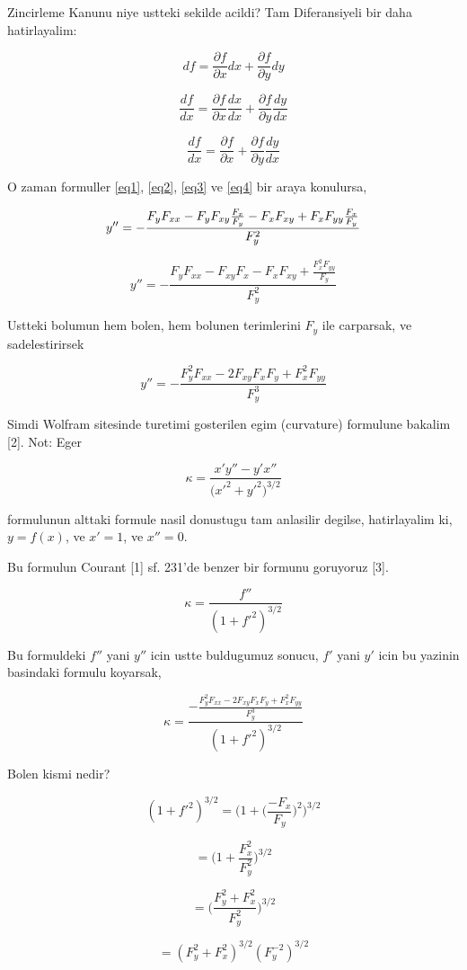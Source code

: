 \documentclass[12pt,fleqn]{article}\usepackage{../common}
\begin{document}
Zincirleme Kanunu niye ustteki sekilde acildi? Tam Diferansiyeli bir daha
hatirlayalim:

\[ df = \frac{\partial f}{\partial x} dx + \frac{\partial f}{\partial y} dy  \]

\[ \frac{df}{dx} = \frac{\partial f}{\partial x} \frac{dx}{dx} + \frac{\partial f}{\partial y} \frac{dy}{dx}  \]

\[ \frac{df}{dx} = \frac{\partial f}{\partial x} + \frac{\partial f}{\partial y} \frac{dy}{dx}  \]

O zaman formuller \ref{eq1}, \ref{eq2}, \ref{eq3} ve \ref{eq4} bir araya konulursa,

\[ y '' = - \frac{F_yF_{xx} - F_y F_{xy}\frac{F_x}{F_y} - F_xF_{xy} + F_xF_{yy}\frac{F_x}{F_y}}{F_y^2}\\ \]

\[ y '' = - \frac{F_yF_{xx} - F_{xy}F_x - F_xF_{xy} + \frac{F_x^2F_{yy}}{F_y}}{F_y^2} \]

Ustteki bolumun hem bolen, hem bolunen terimlerini $F_y$ ile carparsak, ve
sadelestirirsek

\[ y '' = - \frac{F_y^2F_{xx} - 2F_{xy}F_xF_y + F_x^2F_{yy}}{F_y^3} \]

Simdi Wolfram sitesinde turetimi gosterilen egim (curvature) formulune
bakalim [2]. Not: Eger 

\[ \kappa = \frac{x'y''-y'x''}{\bigg(x'^2 + y'^2 \bigg)^{3/2}} \]

formulunun alttaki formule nasil donustugu tam anlasilir degilse, hatirlayalim ki,
$y=f(x)$, ve $x'=1$, ve $x'' = 0$. 

Bu formulun Courant [1] sf. 231'de benzer bir formunu goruyoruz [3]. 

\[ \kappa = \frac{f''}{(1+f'^2)^{3/2}} \]

Bu formuldeki $f''$ yani $y''$ icin ustte buldugumuz sonucu, $f'$ yani $y'$ icin
bu yazinin basindaki formulu koyarsak,

\[ 
\kappa = \frac
{-\frac
{\displaystyle F_y^2F_{xx} - 2F_{xy}F_xF_y +  F_x^2F_{yy}}{\displaystyle F_y^3}}
{(1+f'^2)^{3/2}} 
\]  

Bolen kismi nedir?

\[ (1+f'^2)^{3/2} = \bigg( 1 + \bigg(\frac{-F_x}{F_y}\bigg)^2 \bigg)^{3/2}  \]

\[ = \bigg( 1 + \frac{F_x^2}{F_y^2} \bigg)^{3/2}  \]

\[ = \bigg( \frac{F_y^2 + F_x^2}{F_y^2} \bigg)^{3/2}  \]

\[ = (F_y^2 + F_x^2)^{3/2}(F_y^{-2})^{3/2}  \]
\end{document}
